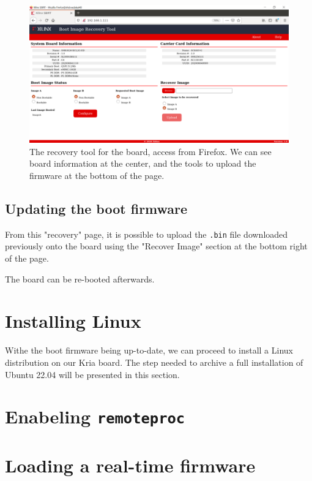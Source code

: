 \documentclass[10pt]{article}
\begin{document}
\begin{figure}[htbp]
\centering
\includegraphics[width=1\textwidth]{img/recovery.png}
\caption{\label{fig:org9f18033}The recovery tool for the board, access from Firefox. We can see board information at the center, and the tools to upload the firmware at the bottom of the page.}
\end{figure}

\subsection{Updating the boot firmware}
\label{sec:orgaacdd5d}
From this "recovery" page, it is possible to upload the \texttt{.bin} file downloaded previously onto
the board using the "Recover Image" section at the bottom right of the page.

The board can be re-booted afterwards.

\section{Installing Linux}
\label{sec:orga1dfecf}
Withe the boot firmware being up-to-date, we can proceed to install a Linux distribution
on our Kria board. The step needed to archive a full installation of Ubuntu 22.04
will be presented in this section.

\section{Enabeling \texttt{remoteproc}}
\label{sec:org59ca0f1}

\section{Loading a real-time firmware}
\label{sec:org73db40c}
\end{document}
